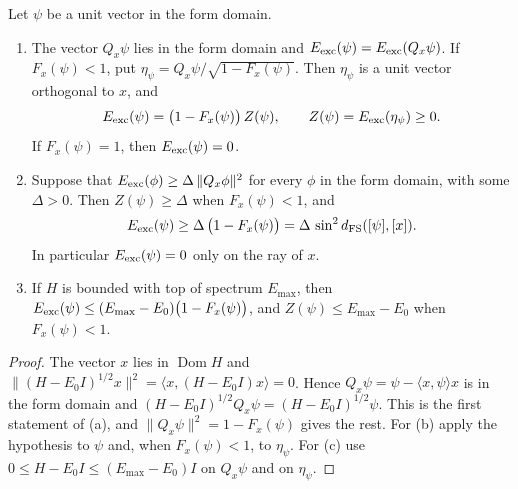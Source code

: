 \begin{proposition}
\label{prop:fidelity-energy}
Let $\psi$ be a unit vector in the form domain.
\begin{enumerate}
\item[(a)] The vector $Q_x\psi$ lies in the form domain and $E_{\rm exc}(\psi)=E_{\rm exc}(Q_x\psi)$. If $F_x(\psi)<1$, put $\eta_\psi=Q_x\psi/\sqrt{1-F_x(\psi)}$. Then $\eta_\psi$ is a unit vector orthogonal to $x$, and
\begin{equation}
 E_{\rm exc}(\psi)=\bigl(1-F_x(\psi)\bigr)\,Z(\psi),\qquad Z(\psi)=E_{\rm exc}(\eta_\psi)\ge0 .
 \label{eq:fidelity-energy-factor}
\end{equation}
If $F_x(\psi)=1$, then $E_{\rm exc}(\psi)=0$.
\item[(b)] Suppose that $E_{\rm exc}(\phi)\ge\Delta\,\|Q_x\phi\|^2$ for every $\phi$ in the form domain, with some $\Delta>0$. Then $Z(\psi)\ge\Delta$ when $F_x(\psi)<1$, and
\begin{equation}
 E_{\rm exc}(\psi)\ge\Delta\,\bigl(1-F_x(\psi)\bigr)=\Delta\,\sin^2d_{\rm FS}([\psi],[x]).
 \label{eq:fidelity-energy-gap}
\end{equation}
In particular $E_{\rm exc}(\psi)=0$ only on the ray of $x$.
\item[(c)] If $H$ is bounded with top of spectrum $E_{\max}$, then $E_{\rm exc}(\psi)\le(E_{\max}-E_0)\bigl(1-F_x(\psi)\bigr)$, and $Z(\psi)\le E_{\max}-E_0$ when $F_x(\psi)<1$.
\end{enumerate}
\end{proposition}
\begin{proof}
The vector $x$ lies in $\operatorname{Dom}H$ and $\|(H-E_0I)^{1/2}x\|^2=\langle x,(H-E_0I)x\rangle=0$. Hence $Q_x\psi=\psi-\langle x,\psi\rangle x$ is in the form domain and $(H-E_0I)^{1/2}Q_x\psi=(H-E_0I)^{1/2}\psi$. This is the first statement of (a), and $\|Q_x\psi\|^2=1-F_x(\psi)$ gives the rest. For (b) apply the hypothesis to $\psi$ and, when $F_x(\psi)<1$, to $\eta_\psi$. For (c) use $0\le H-E_0I\le(E_{\max}-E_0)I$ on $Q_x\psi$ and on $\eta_\psi$.
\end{proof}

